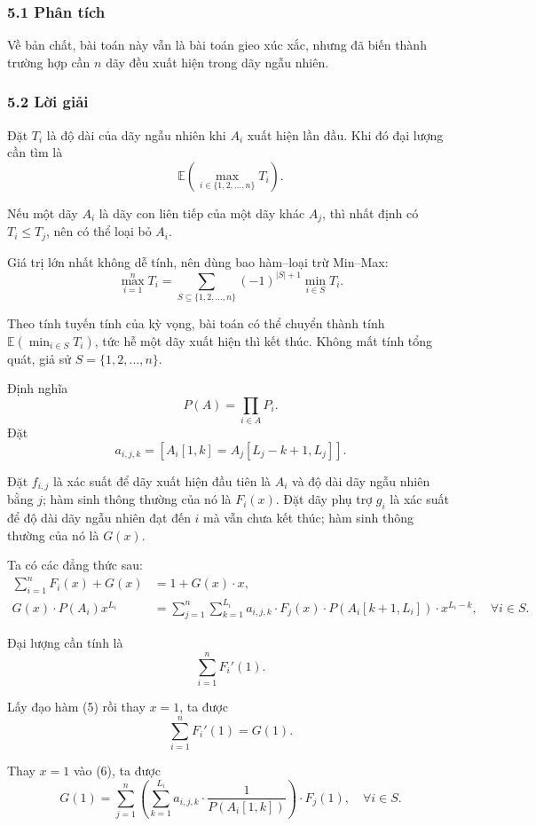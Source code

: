\documentclass[11pt]{article}
\begin{document}
\subsubsection*{5.1 Phân tích}

Về bản chất, bài toán này vẫn là bài toán gieo xúc xắc, nhưng đã biến thành
trường hợp cần \(n\) dãy đều xuất hiện trong dãy ngẫu nhiên.

\subsubsection*{5.2 Lời giải}

Đặt \(T_i\) là độ dài của dãy ngẫu nhiên khi \(A_i\) xuất hiện lần đầu. Khi đó
đại lượng cần tìm là
\[
  \mathbb{E}\!\left(\max_{i\in\{1,2,\ldots,n\}}T_i\right).
\]

Nếu một dãy \(A_i\) là dãy con liên tiếp của một dãy khác \(A_j\), thì nhất định
có \(T_i\le T_j\), nên có thể loại bỏ \(A_i\).

Giá trị lớn nhất không dễ tính, nên dùng bao hàm--loại trừ Min--Max:
\[
  \max_{i=1}^{n}T_i
  =\sum_{S\subseteq\{1,2,\ldots,n\}}(-1)^{|S|+1}
   \min_{i\in S}T_i .
\]

Theo tính tuyến tính của kỳ vọng, bài toán có thể chuyển thành tính
\(\mathbb{E}(\min_{i\in S}T_i)\), tức hễ một dãy xuất hiện thì kết thúc. Không
mất tính tổng quát, giả sử \(S=\{1,2,\ldots,n\}\).

Định nghĩa
\[
  P(A)=\prod_{i\in A}P_i .
\]
Đặt
\[
  a_{i,j,k}=[A_i[1,k]=A_j[L_j-k+1,L_j]] .
\]

Đặt \(f_{i,j}\) là xác suất để dãy xuất hiện đầu tiên là \(A_i\) và độ dài dãy
ngẫu nhiên bằng \(j\); hàm sinh thông thường của nó là \(F_i(x)\). Đặt dãy phụ
trợ \(g_i\) là xác suất để độ dài dãy ngẫu nhiên đạt đến \(i\) mà vẫn chưa kết
thúc; hàm sinh thông thường của nó là \(G(x)\).

Ta có các đẳng thức sau:
\begin{align}
  \sum_{i=1}^{n}F_i(x)+G(x) &= 1+G(x)\cdot x, \tag{5}\\
  G(x)\cdot P(A_i)x^{L_i}
    &= \sum_{j=1}^{n}\sum_{k=1}^{L_i}
       a_{i,j,k}\cdot F_j(x)\cdot P(A_i[k+1,L_i])\cdot x^{L_i-k},
       \quad \forall i\in S . \tag{6}
\end{align}

Đại lượng cần tính là
\[
  \sum_{i=1}^{n}F_i'(1).
\]

Lấy đạo hàm (5) rồi thay \(x=1\), ta được
\[
  \sum_{i=1}^{n}F_i'(1)=G(1).
\]

Thay \(x=1\) vào (6), ta được
\[
  G(1)=\sum_{j=1}^{n}
       \left(\sum_{k=1}^{L_i}a_{i,j,k}\cdot\frac{1}{P(A_i[1,k])}\right)
       \cdot F_j(1),\quad \forall i\in S .
\]
\end{document}
